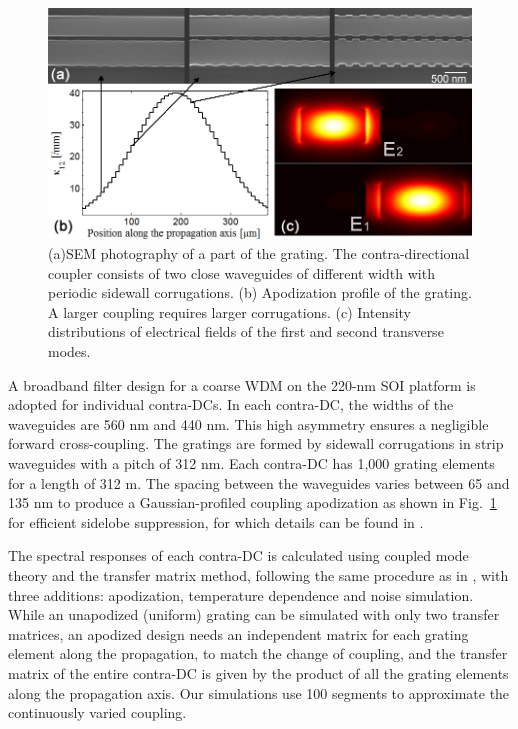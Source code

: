 \documentclass[9pt,twocolumn,twoside]{osajnl}
\begin{document}
	\begin{figure}[htbp]
		\centering
		\includegraphics[width=1\columnwidth]{data/FigApod}
		\caption{(a)SEM photography of a part of the grating. The contra-directional coupler consists of two close waveguides of different width with periodic sidewall corrugations. (b) Apodization profile of the grating. A larger coupling requires larger corrugations. (c) Intensity distributions of electrical fields of the first and second transverse modes. }
		\label{fig:SEM}
	\end{figure} 
	
	
	A broadband filter design for a coarse WDM on the 220-nm SOI platform \cite{shi2013siliconCWDM} is adopted for individual contra-DCs.  
	In each contra-DC, the widths of the waveguides are 560 nm and 440 nm.
	This high asymmetry ensures a negligible forward cross-coupling. 
	The gratings are formed by sidewall corrugations in strip waveguides with a pitch of 312 nm.
	Each contra-DC has 1,000 grating elements for a length of 312 \textmu m.
	The spacing between the waveguides varies between 65 and 135 nm to produce a Gaussian-profiled coupling apodization as shown in Fig.~\ref{fig:SEM} for efficient sidelobe suppression, for which details can be found in \cite{shi2013siliconCWDM}.
	
	The spectral responses of each contra-DC is calculated using coupled mode theory and the transfer matrix method, following the same procedure as in  \cite{shi2013siliconContraDC}, with three additions: apodization, temperature dependence and noise simulation.
	While an unapodized (uniform) grating can be simulated with only two transfer matrices,
	an apodized design needs an independent matrix for each grating element along the propagation, to match the change of coupling, and the transfer matrix of the entire contra-DC is given by the product of all the grating elements along the propagation axis.
	Our simulations use 100 segments to approximate the continuously varied coupling.
	
\end{document}
